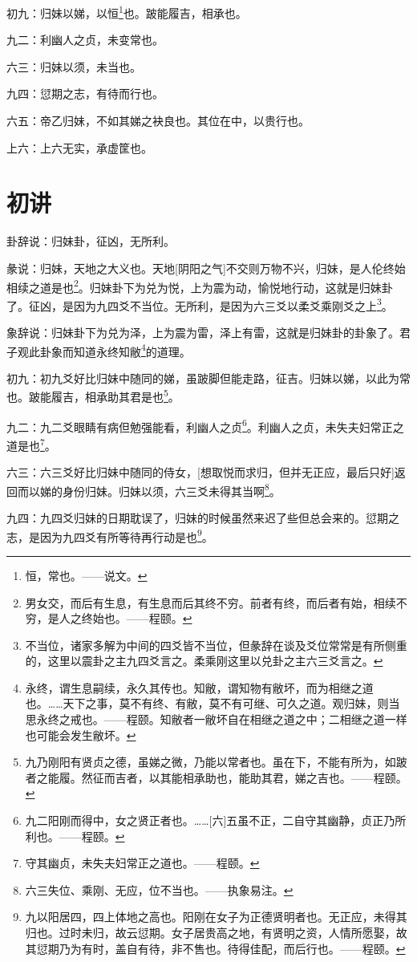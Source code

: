 \documentclass[12pt,oneside]{book}
\begin{document}
初九：归妹以娣，以恒\footnote{恒，常也。——说文。}也。跛能履吉，相承也。

九二：利幽人之贞，未变常也。

六三：归妹以须，未当也。

九四：愆期之志，有待而行也。

六五：帝乙归妹，不如其娣之袂良也。其位在中，以贵行也。

上六：上六无实，承虚筐也。


\section{初讲}
卦辞说：归妹卦，征凶，无所利。

彖说：归妹，天地之大义也。天地[阴阳之气]不交则万物不兴，归妹，是人伦终始相续之道是也\footnote{男女交，而后有生息，有生息而后其终不穷。前者有终，而后者有始，相续不穷，是人之终始也。——程颐。}。归妹卦下为兑为悦，上为震为动，愉悦地行动，这就是归妹卦了。征凶，是因为九四爻不当位。无所利，是因为六三爻以柔爻乘刚爻之上\footnote{不当位，诸家多解为中间的四爻皆不当位，但彖辞在谈及爻位常常是有所侧重的，这里以震卦之主九四爻言之。柔乘刚这里以兑卦之主六三爻言之。}。

象辞说：归妹卦下为兑为泽，上为震为雷，泽上有雷，这就是归妹卦的卦象了。君子观此卦象而知道永终知敝\footnote{永终，谓生息嗣续，永久其传也。知敝，谓知物有敝坏，而为相继之道也。……天下之事，莫不有终、有敝，莫不有可继、可久之道。观归妹，则当思永终之戒也。——程颐。知敝者一敝坏自在相继之道之中；二相继之道一样也可能会发生敝坏。}的道理。

初九：初九爻好比归妹中随同的娣，虽跛脚但能走路，征吉。归妹以娣，以此为常也。跛能履吉，相承助其君是也\footnote{九乃刚阳有贤贞之德，虽娣之微，乃能以常者也。虽在下，不能有所为，如跛者之能履。然征而吉者，以其能相承助也，能助其君，娣之吉也。——程颐。}。

九二：九二爻眼睛有病但勉强能看，利幽人之贞\footnote{九二阳刚而得中，女之贤正者也。……[六]五虽不正，二自守其幽静，贞正乃所利也。——程颐。}。利幽人之贞，未失夫妇常正之道是也\footnote{守其幽贞，未失夫妇常正之道也。——程颐。}。

六三：六三爻好比归妹中随同的侍女，[想取悦而求归，但并无正应，最后只好]返回而以娣的身份归妹。归妹以须，六三爻未得其当啊\footnote{六三失位、乘刚、无应，位不当也。——执象易注。}。

九四：九四爻归妹的日期耽误了，归妹的时候虽然来迟了些但总会来的。愆期之志，是因为九四爻有所等待再行动是也\footnote{九以阳居四，四上体地之高也。阳刚在女子为正德贤明者也。无正应，未得其归也。过时未归，故云愆期。女子居贵高之地，有贤明之资，人情所愿娶，故其愆期乃为有时，盖自有待，非不售也。待得佳配，而后行也。——程颐。}。
\end{document}
